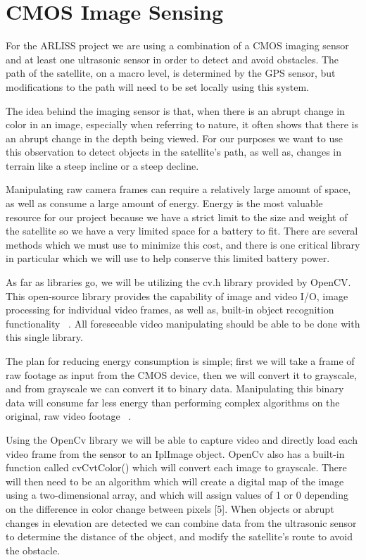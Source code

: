 \documentclass[10pt,letterpaper,onecolumn,journal]{IEEEtran}
\begin{document}
\section{CMOS Image Sensing}
For the ARLISS project we are using a combination of a CMOS imaging sensor and at least one ultrasonic sensor in order to detect and avoid obstacles. The path of the satellite, on a macro level, is determined by the GPS sensor, but modifications to the path will need to be set locally using this system.\vspace{.3cm}
\par
The idea behind the imaging sensor is that, when there is an abrupt change in color in an image, especially when referring to nature, it often shows that there is an abrupt change in the depth being viewed. For our purposes we want to use this observation to detect objects in the satellite's path, as well as, changes in terrain like a steep incline or a steep decline.\vspace{.3cm}
\par  
Manipulating raw camera frames can require a relatively large amount of space, as well as consume a large amount of energy. Energy is the most valuable resource for our project because we have a strict limit to the size and weight of the satellite so we have a very limited space for a battery to fit. There are several methods which we must use to minimize this cost, and there is one critical library in particular which we will use to help conserve this limited battery power.\vspace{.3cm}
\par 
As far as libraries go, we will be utilizing the cv.h library provided by OpenCV. This open-source library provides the capability of image and video I/O, image processing for individual video frames, as well as, built-in object recognition functionality ~\cite{agam2006}. All foreseeable video manipulating should be able to be done with this single library.\vspace{.3cm}
\par 
The plan for reducing energy consumption is simple; first we will take a frame of raw footage as input from the CMOS device, then we will convert it to grayscale, and from grayscale we can convert it to binary data. Manipulating this binary data will consume far less energy than performing complex algorithms on the original, raw video footage ~\cite{ikalogic}.\vspace{.3cm}
\par
Using the OpenCv library we will be able to capture video and directly load each video frame from the sensor to an IplImage object. OpenCv also has a built-in function called cvCvtColor() which will convert each image to grayscale. There will then need to be an algorithm which will create a digital map of the image using a two-dimensional array, and which will assign values of 1 or 0 depending on the difference in color change between pixels [5]. When objects or abrupt changes in elevation are detected we can combine data from the ultrasonic sensor to determine the distance of the object, and modify the satellite's route to avoid the obstacle.\vspace{.3cm}
\end{document}
